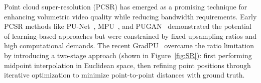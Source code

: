 




\label{sec:pcsr}
Point cloud super-resolution (PCSR) has emerged as a promising technique for enhancing volumetric video quality while reducing bandwidth requirements. Early PCSR methods like PU-Net~\cite{yu_pu-net_2018}, MPU~\cite{yifan2019patch}, and PUGAN~\cite{li_pu-gan_2019} demonstrated the potential of learning-based approaches but were constrained by fixed upsampling ratios and high computational demands. The recent GradPU~\cite{he_grad-pu_2023} overcame the ratio limitation by introducing a two-stage approach (shown in Figure~\ref{fig:SR}): first performing midpoint interpolation in Euclidean space, then refining point positions through iterative optimization to minimize point-to-point distances with ground truth.

